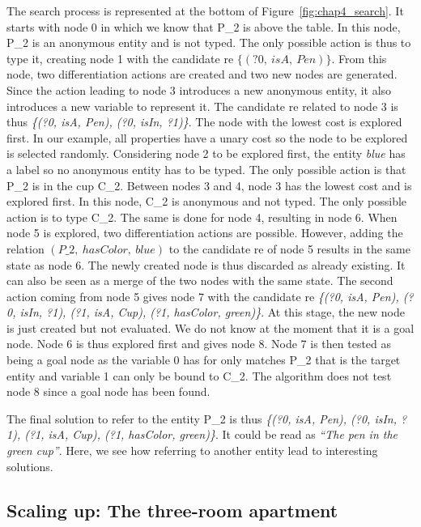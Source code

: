 The search process is represented at the bottom of Figure~\ref{fig:chap4_search}. It starts with node 0 in which we know that P\_2 is above the table. In this node, P\_2 is an anonymous entity and is not typed. The only possible action is thus to type it, creating node 1 with the candidate \acrshort{re} $\{(?0,\ isA,\ Pen)\}$. From this node, two differentiation actions are created and two new nodes are generated. Since the action leading to node 3 introduces a new anonymous entity, it also introduces a new variable to represent it. The candidate \acrshort{re} related to node 3 is thus \textit{\{(?0, isA, Pen), (?0, isIn, ?1)\}}. The node with the lowest cost is explored first. In our example, all properties have a unary cost so the node to be explored is selected randomly. Considering node 2 to be explored first, the entity \textit{blue} has a label so no anonymous entity has to be typed. The only possible action is that P\_2 is in the cup C\_2. Between nodes 3 and 4, node 3 has the lowest cost and is explored first. In this node, C\_2 is anonymous and not typed. The only possible action is to type C\_2. The same is done for node 4, resulting in node 6. When node 5 is explored, two differentiation actions are possible. However, adding the relation $(P\_2,\ hasColor,\ blue)$ to the candidate \acrshort{re} of node 5 results in the same state as node 6. The newly created node is thus discarded as already existing. It can also be seen as a merge of the two nodes with the same state. The second action coming from node 5 gives node 7 with the candidate \acrshort{re} \textit{\{(?0, isA, Pen), (?0, isIn, ?1), (?1, isA, Cup), (?1, hasColor, green)\}}. At this stage, the new node is just created but not evaluated. We do not know at the moment that it is a goal node. Node 6 is thus explored first and gives node 8. Node 7 is then tested as being a goal node as the variable 0 has for only matches P\_2 that is the target entity and variable 1 can only be bound to C\_2. The algorithm does not test node 8 since a goal node has been found.

The final solution to refer to the entity P\_2 is thus \textit{\{(?0, isA, Pen), (?0, isIn, ?1), (?1, isA, Cup), (?1, hasColor, green)\}}. It could be read as \textit{``The pen in the green cup''}. Here, we see how referring to another entity lead to interesting solutions.


\subsection{Scaling up: The three-room apartment}

